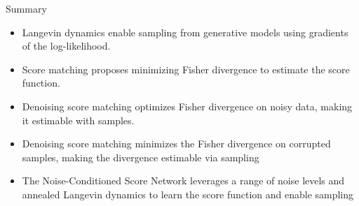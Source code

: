 \documentclass{beamer}
\begin{document}
\begin{frame}{Summary}
	\begin{itemize}
		\item Langevin dynamics enable sampling from generative models using gradients of the log-likelihood.
		\vfill
		\item Score matching proposes minimizing Fisher divergence to estimate the score function.
		\vfill
		\item Denoising score matching optimizes Fisher divergence on noisy data, making it estimable with samples.
		\vfill
		\item Denoising score matching minimizes the Fisher divergence on corrupted samples, making the divergence estimable via sampling
		\vfill 
		\item The Noise-Conditioned Score Network leverages a range of noise levels and annealed Langevin dynamics to learn the score function and enable sampling	
	\end{itemize}
\end{frame}
\end{document}

